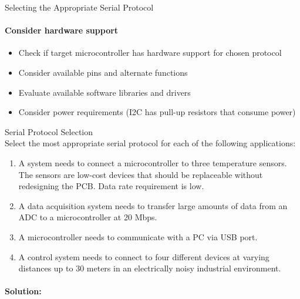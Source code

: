 \begin{KR}{Selecting the Appropriate Serial Protocol}
\paragraph{Consider hardware support}
\begin{itemize}
    \item Check if target microcontroller has hardware support for chosen protocol
    \item Consider available pins and alternate functions
    \item Evaluate available software libraries and drivers
    \item Consider power requirements (I2C has pull-up resistors that consume power)
\end{itemize}
\end{KR}

\begin{example2}{Serial Protocol Selection}\\
Select the most appropriate serial protocol for each of the following applications:
\begin{enumerate}
    \item A system needs to connect a microcontroller to three temperature sensors. The sensors are low-cost devices that should be replaceable without redesigning the PCB. Data rate requirement is low.
    \item A data acquisition system needs to transfer large amounts of data from an ADC to a microcontroller at 20 Mbps.
    \item A microcontroller needs to communicate with a PC via USB port.
    \item A control system needs to connect to four different devices at varying distances up to 30 meters in an electrically noisy industrial environment.
\end{enumerate}
\paragraph{Solution:}


\end{example2}
